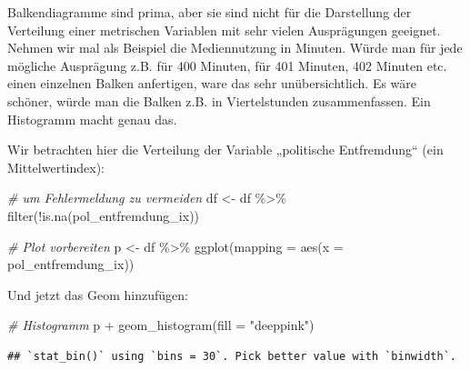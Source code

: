 \documentclass[
]{book}
\newenvironment{Shaded}{\begin{snugshade}}{\end{snugshade}}
\newcommand{\AttributeTok}[1]{\textcolor[rgb]{0.77,0.63,0.00}{#1}}
\newcommand{\CommentTok}[1]{\textcolor[rgb]{0.56,0.35,0.01}{\textit{#1}}}
\newcommand{\FunctionTok}[1]{\textcolor[rgb]{0.00,0.00,0.00}{#1}}
\newcommand{\NormalTok}[1]{#1}
\newcommand{\OtherTok}[1]{\textcolor[rgb]{0.56,0.35,0.01}{#1}}
\newcommand{\SpecialCharTok}[1]{\textcolor[rgb]{0.00,0.00,0.00}{#1}}
\newcommand{\StringTok}[1]{\textcolor[rgb]{0.31,0.60,0.02}{#1}}
\begin{document}
Balkendiagramme sind prima, aber sie sind nicht für die Darstellung der Verteilung einer metrischen Variablen mit sehr vielen Ausprägungen geeignet. Nehmen wir mal als Beispiel die Mediennutzung in Minuten. Würde man für jede mögliche Ausprägung z.B. für 400 Minuten, für 401 Minuten, 402 Minuten etc. einen einzelnen Balken anfertigen, ware das sehr unübersichtlich. Es wäre schöner, würde man die Balken z.B. in Viertelstunden zusammenfassen. Ein Histogramm macht genau das.

Wir betrachten hier die Verteilung der Variable „politische Entfremdung`` (ein Mittelwertindex):

\begin{Shaded}
\begin{Highlighting}[]
\CommentTok{\# um Fehlermeldung zu vermeiden}
\NormalTok{df }\OtherTok{\textless{}{-}}\NormalTok{ df }\SpecialCharTok{\%\textgreater{}\%} 
  \FunctionTok{filter}\NormalTok{(}\SpecialCharTok{!}\FunctionTok{is.na}\NormalTok{(pol\_entfremdung\_ix))}
\end{Highlighting}
\end{Shaded}

\begin{Shaded}
\begin{Highlighting}[]
\CommentTok{\# Plot vorbereiten}
\NormalTok{p }\OtherTok{\textless{}{-}}\NormalTok{ df }\SpecialCharTok{\%\textgreater{}\%} 
  \FunctionTok{ggplot}\NormalTok{(}\AttributeTok{mapping =} \FunctionTok{aes}\NormalTok{(}\AttributeTok{x =}\NormalTok{ pol\_entfremdung\_ix))}
\end{Highlighting}
\end{Shaded}

Und jetzt das Geom hinzufügen:

\begin{Shaded}
\begin{Highlighting}[]
\CommentTok{\# Histogramm}
\NormalTok{p }\SpecialCharTok{+} \FunctionTok{geom\_histogram}\NormalTok{(}\AttributeTok{fill =} \StringTok{"deeppink"}\NormalTok{) }
\end{Highlighting}
\end{Shaded}

\begin{verbatim}
## `stat_bin()` using `bins = 30`. Pick better value with `binwidth`.
\end{verbatim}
\end{document}

